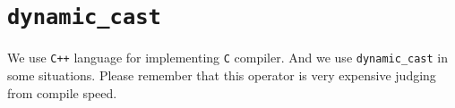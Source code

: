 
\section{{\tt{dynamic\_cast}}}

We use {\tt{C++}} language for implementing {\tt{C}} compiler.
And we use {\tt{dynamic\_cast}} in some situations.
Please remember that
this operator is very expensive judging from compile speed.

